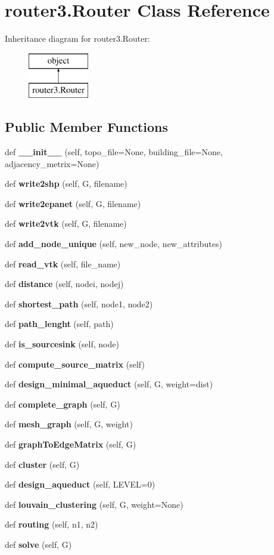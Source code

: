 \section{router3.\+Router Class Reference}
\label{classrouter3_1_1_router}
Inheritance diagram for router3.\+Router\+:\begin{figure}[H]
\begin{center}
\leavevmode
\includegraphics[height=2.000000cm]{classrouter3_1_1_router}
\end{center}
\end{figure}
\subsection*{Public Member Functions}
\begin{DoxyCompactItemize}
\item 
def \textbf{ \+\_\+\+\_\+init\+\_\+\+\_\+} (self, topo\+\_\+file=None, building\+\_\+file=None, adjacency\+\_\+metrix=None)
\item 
def \textbf{ write2shp} (self, G, filename)
\item 
def \textbf{ write2epanet} (self, G, filename)
\item 
def \textbf{ write2vtk} (self, G, filename)
\item 
def \textbf{ add\+\_\+node\+\_\+unique} (self, new\+\_\+node, new\+\_\+attributes)
\item 
def \textbf{ read\+\_\+vtk} (self, file\+\_\+name)
\item 
def \textbf{ distance} (self, nodei, nodej)
\item 
def \textbf{ shortest\+\_\+path} (self, node1, node2)
\item 
def \textbf{ path\+\_\+lenght} (self, path)
\item 
def \textbf{ is\+\_\+sourcesink} (self, node)
\item 
def \textbf{ compute\+\_\+source\+\_\+matrix} (self)
\item 
def \textbf{ design\+\_\+minimal\+\_\+aqueduct} (self, G, weight=\textquotesingle{}dist\textquotesingle{})
\item 
def \textbf{ complete\+\_\+graph} (self, G)
\item 
def \textbf{ mesh\+\_\+graph} (self, G, weight)
\item 
def \textbf{ graph\+To\+Edge\+Matrix} (self, G)
\item 
def \textbf{ cluster} (self, G)
\item 
def \textbf{ design\+\_\+aqueduct} (self, L\+E\+V\+EL=0)
\item 
def \textbf{ louvain\+\_\+clustering} (self, G, weight=None)
\item 
def \textbf{ routing} (self, n1, n2)
\item 
def \textbf{ solve} (self, G)
\end{DoxyCompactItemize}
